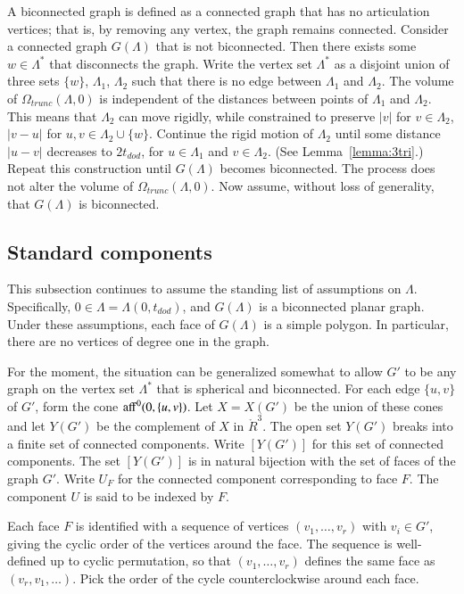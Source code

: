 \documentclass{article} %
\begin{document}
A biconnected graph is defined as a connected graph that has no
articulation vertices; that is, by removing any vertex, the graph
remains connected. Consider a connected graph $G(\Lambda)$ that is not
biconnected. Then there exists some $w\in \Lambda^*$ that disconnects
the graph. Write the vertex set $\Lambda^*$ as a disjoint union of
three sets $\{w\}$, $\Lambda_1$, $\Lambda_2$ such that there is no
edge between $\Lambda_1$ and $\Lambda_2$. The volume of
$\Omega_{trunc}(\Lambda,0)$ is independent of the distances between
points of $\Lambda_1$ and $\Lambda_2$. This means that $\Lambda_2$ can
move rigidly, while constrained to preserve $|v|$ for $v\in\Lambda_2$,
$|v-u|$ for $u,v\in \Lambda_2\cup\{w\}$. Continue the rigid motion of
$\Lambda_2$ until some distance $|u-v|$ decreases to $2t_{dod}$, for
$u\in\Lambda_1$ and $v\in\Lambda_2$. (See Lemma~\ref{lemma:3tri}.)
Repeat this construction until $G(\Lambda)$ becomes biconnected. The
process does not alter the volume of $\Omega_{trunc}(\Lambda,0)$. Now
assume, without loss of generality, that $G(\Lambda)$ is biconnected.

\subsection{Standard components}

This subsection continues to assume the standing list of assumptions
on $\Lambda$. Specifically, $0\in\Lambda = \Lambda(0,t_{dod})$, and
$G(\Lambda)$ is a biconnected planar graph. Under these assumptions,
each face of $G(\Lambda)$ is a simple polygon. In particular, there
are no vertices of degree one in the graph.

For the moment, the situation can be generalized somewhat to allow
$G'$ to be any graph on the vertex set $\Lambda^*$ that is spherical and
biconnected. For each edge $\{u,v\}$ of $G'$, form the cone
${\operatorname{aff}}^0(0,\{u,v\})$. Let $X=X(G')$ be the union of these cones and
let $Y(G')$ be the complement of $X$ in $\ring{R}^3$. The open set
$Y(G')$ breaks into a finite set of connected components. Write
$[Y(G')]$ for this set of connected components. The set $[Y(G')]$ is
in natural bijection with the set of faces of the graph $G'$. Write
$U_F$ for the connected component corresponding to face $F$. The
component $U$ is said to be indexed by $F$.

Each face $F$ is identified with a sequence of vertices
$(v_1,\ldots,v_r)$ with $v_i\in G'$, giving the cyclic order of the
vertices around the face. The sequence is well-defined up to cyclic
permutation, so that $(v_1,\ldots,v_r)$ defines the same face as
$(v_r,v_1,\ldots)$. Pick the order of the cycle counterclockwise
around each face.  %
\end{document}

